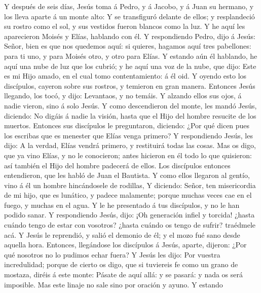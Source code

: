 Y después de seis días, Jesús toma á Pedro, y á Jacobo, y
á Juan su hermano, y los lleva aparte á un monte alto:  Y
se transfiguró delante de ellos; y resplandeció su rostro como el sol, y
sus vestidos fueron blancos como la luz.  Y he aquí les
aparecieron Moisés y Elías, hablando con él.  Y
respondiendo Pedro, dijo á Jesús: Señor, bien es que nos quedemos aquí:
si quieres, hagamos aquí tres pabellones: para ti uno, y para Moisés
otro, y otro para Elías.  Y estando aún él hablando, he
aquí una nube de luz que los cubrió; y he aquí una voz de la nube, que
dijo: Este es mi Hijo amado, en el cual tomo contentamiento: á él oid.
 Y oyendo esto los discípulos, cayeron sobre sus rostros,
y temieron en gran manera.  Entonces Jesús llegando, los
tocó, y dijo: Levantaos, y no temáis.  Y alzando ellos sus
ojos, á nadie vieron, sino á solo Jesús.  Y como
descendieron del monte, les mandó Jesús, diciendo: No digáis á nadie la
visión, hasta que el Hijo del hombre resucite de los muertos.
 Entonces sus discípulos le preguntaron, diciendo: ¿Por
qué dicen pues los escribas que es menester que Elías venga primero?
 Y respondiendo Jesús, les dijo: A la verdad, Elías
vendrá primero, y restituirá todas las cosas.  Mas os
digo, que ya vino Elías, y no le conocieron; antes hicieron en él todo
lo que quisieron: así también el Hijo del hombre padecerá de ellos.
 Los discípulos entonces entendieron, que les habló de
Juan el Bautista.  Y como ellos llegaron al gentío, vino
á él un hombre hincándosele de rodillas,  Y diciendo:
Señor, ten misericordia de mi hijo, que es lunático, y padece malamente;
porque muchas veces cae en el fuego, y muchas en el agua.
 Y le he presentado á tus discípulos, y no le han podido
sanar.  Y respondiendo Jesús, dijo: ¡Oh generación infiel
y torcida! ¿hasta cuándo tengo de estar con vosotros? ¿hasta cuándo os
tengo de sufrir? traédmele acá.  Y Jesús le reprendió, y
salió el demonio de él; y el mozo fué sano desde aquella hora.
 Entonces, llegándose los discípulos á Jesús, aparte,
dijeron: ¿Por qué nosotros no lo pudimos echar fuera?  Y
Jesús les dijo: Por vuestra incredulidad; porque de cierto os digo, que
si tuviereis fe como un grano de mostaza, diréis á este monte: Pásate de
aquí allá: y se pasará: y nada os será imposible.  Mas
este linaje no sale sino por oración y ayuno.  Y estando
